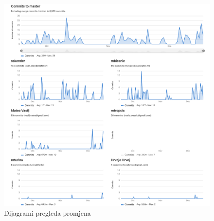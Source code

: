 		\begin{figure}[H]
					\includegraphics[scale=0.4]{figures/dnevnik.PNG}
					\centering
					\caption{Dijagrami pregleda promjena}
					\label{fig:Dijagrami pregleda promjena}
				\end{figure}	